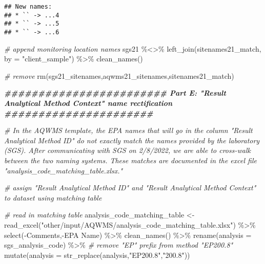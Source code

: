 \documentclass[
]{book}
\newenvironment{Shaded}{\begin{snugshade}}{\end{snugshade}}
\newcommand{\AttributeTok}[1]{\textcolor[rgb]{0.77,0.63,0.00}{#1}}
\newcommand{\CommentTok}[1]{\textcolor[rgb]{0.56,0.35,0.01}{\textit{#1}}}
\newcommand{\DocumentationTok}[1]{\textcolor[rgb]{0.56,0.35,0.01}{\textbf{\textit{#1}}}}
\newcommand{\FunctionTok}[1]{\textcolor[rgb]{0.00,0.00,0.00}{#1}}
\newcommand{\NormalTok}[1]{#1}
\newcommand{\OtherTok}[1]{\textcolor[rgb]{0.56,0.35,0.01}{#1}}
\newcommand{\SpecialCharTok}[1]{\textcolor[rgb]{0.00,0.00,0.00}{#1}}
\newcommand{\StringTok}[1]{\textcolor[rgb]{0.31,0.60,0.02}{#1}}
\begin{document}
\begin{verbatim}
## New names:
## * `` -> ...4
## * `` -> ...5
## * `` -> ...6
\end{verbatim}

\begin{Shaded}
\begin{Highlighting}[]
\CommentTok{\# append monitoring location names}
\NormalTok{sgs21 }\SpecialCharTok{\%\textless{}\textgreater{}\%}
  \FunctionTok{left\_join}\NormalTok{(sitenames21\_match, }\AttributeTok{by =} \StringTok{"client\_sample"}\NormalTok{) }\SpecialCharTok{\%\textgreater{}\%}
  \FunctionTok{clean\_names}\NormalTok{() }

\CommentTok{\# remove}
\FunctionTok{rm}\NormalTok{(sgs21\_sitenames,aqwms21\_sitenames,sitenames21\_match)}






\DocumentationTok{\#\#\#\#\#\#\#\#\#\#\#\#\#\#\#\#\#\#\#\#\#\#\#\# Part E: "Result Analytical Method Context" name rectification \#\#\#\#\#\#\#\#\#\#\#\#\#\#\#\#\#\#\#\#\#\#}

\CommentTok{\# In the AQWMS template, the EPA names that will go in the column "Result Analytical Method ID" do not exactly match the names provided by the laboratory (SGS). After communicating with SGS on 2/8/2022, we are able to cross{-}walk between the two naming systems. These matches are documented in the excel file "analysis\_code\_matching\_table.xlsx."}

\CommentTok{\# assign "Result Analytical Method ID" and "Result Analytical Method Context" to dataset using matching table}

\CommentTok{\# read in matching table}
\NormalTok{analysis\_code\_matching\_table }\OtherTok{\textless{}{-}} \FunctionTok{read\_excel}\NormalTok{(}\StringTok{"other/input/AQWMS/analysis\_code\_matching\_table.xlsx"}\NormalTok{) }\SpecialCharTok{\%\textgreater{}\%}
  \FunctionTok{select}\NormalTok{(}\SpecialCharTok{{-}}\NormalTok{Comments,}\SpecialCharTok{{-}}\StringTok{\textasciigrave{}}\AttributeTok{EPA Name}\StringTok{\textasciigrave{}}\NormalTok{) }\SpecialCharTok{\%\textgreater{}\%}
  \FunctionTok{clean\_names}\NormalTok{() }\SpecialCharTok{\%\textgreater{}\%}
  \FunctionTok{rename}\NormalTok{(}\AttributeTok{analysis =}\NormalTok{ sgs\_analysis\_code) }\SpecialCharTok{\%\textgreater{}\%}
  \CommentTok{\# remove "EP" prefix from method "EP200.8"}
  \FunctionTok{mutate}\NormalTok{(}\AttributeTok{analysis =} \FunctionTok{str\_replace}\NormalTok{(analysis,}\StringTok{"EP200.8"}\NormalTok{,}\StringTok{"200.8"}\NormalTok{))}
  


\end{Highlighting}
\end{Shaded}
\end{document}
